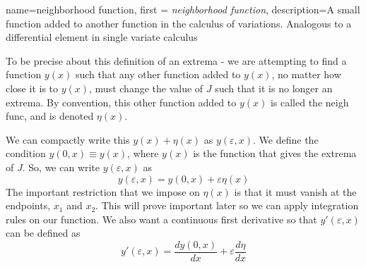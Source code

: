\documentclass[12pt]{report}
\begin{document}
{
    name=neighborhood function,
    first = {\textit{neighborhood function}},
    description={A small function added to another function in the calculus of variations. Analogous to a differential element in single variate calculus}
}

To be precise about this definition of an extrema - we are attempting to find a function $y(x)$ such that any other function added to $y(x)$, no matter how close it is to $y(x)$, must change the value of $J$ such that it is no longer an extrema. By convention, this other function added to $y(x)$ is called the \gls{neigh func}, and is denoted $\eta(x)$.

We can compactly write this $y(x)+\eta(x)$ as $y(\varepsilon,x)$. We define the condition $y(0,x)\equiv y(x)$, where $y(x)$ is the function that gives the extrema of $J$. So, we can write $y(\varepsilon,x)$ as
\begin{equation}\label{eq:y epsilon}
    y(\varepsilon,x)=y(0,x)+\varepsilon\eta(x)
\end{equation}
The important restriction that we impose on $\eta(x)$ is that it must vanish at the endpoints, $x_1$ and $x_2$. This will prove important later so we can apply integration rules on our function. We also want a continuous first derivative so that $y'(\varepsilon,x)$ can be defined as
\begin{equation}\label{eq:y prime epsilon}
    y'(\varepsilon,x)=\frac{dy(0,x)}{dx}+\varepsilon\frac{d\eta}{dx}
\end{equation}
\end{document}
